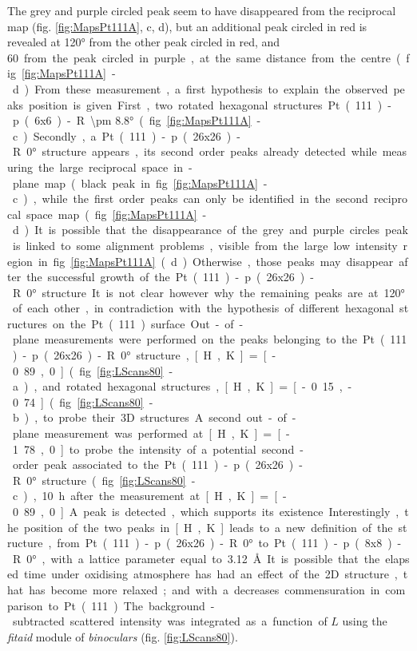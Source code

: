 The grey and purple circled peak seem to have disappeared from the reciprocal map (fig. \ref{fig:MapsPt111A}, c, d), but an additional peak circled in red is revealed at \ang{120} from the other peak circled in red, and \qty{60} from the peak circled in purple, at the same distance from the centre (fig. \ref{fig:MapsPt111A} - d).
From these measurement, a first hypothesis to explain the observed peaks position is given.
First, two rotated hexagonal structures Pt(111)-p(6x6)-R\ang{\pm 8.8} (fig. \ref{fig:MapsPt111A} - c).
Secondly, a Pt(111)-p(26x26)-R\ang{0} structure appears, its second order peaks already detected while measuring the large reciprocal space in-plane map (black peak in fig. \ref{fig:MapsPt111A} - c), while the first order peaks can only be identified in the second reciprocal space map (fig. \ref{fig:MapsPt111A} - d).
It is possible that the disappearance of the grey and purple circles peak is linked to some alignment problems, visible from the large low intensity region in fig. \ref{fig:MapsPt111A} (d).
Otherwise, those peaks may disappear after the successful growth of the Pt(111)-p(26x26)-R\ang{0} structure.
It is not clear however why the remaining peaks are at \ang{120} of each other, in contradiction with the hypothesis of different hexagonal structures on the Pt(111) surface.

Out-of-plane measurements were performed on the peaks belonging to the Pt(111)-p(26x26)-R\ang{0} structure, [H, K] = [-0.89, 0] (fig. \ref{fig:LScans80} - a), and rotated hexagonal structures, [H, K] = [-0.15, -0.74] (fig. \ref{fig:LScans80} - b), to probe their 3D structures.
A second out-of-plane measurement was performed at [H, K] = [-1.78, 0] to probe the intensity of a potential second-order peak associated to the Pt(111)-p(26x26)-R\ang{0} structure (fig. \ref{fig:LScans80} - c), \qty{10}{\hour} after the measurement at [H, K] = [-0.89, 0].
A peak is detected, which supports its existence.

Interestingly, the position of the two peaks in [H, K] leads to a new definition of the structure, from Pt(111)-p(26x26)-R\ang{0} to Pt(111)-p(8x8)-R\ang{0}, with a lattice parameter equal to \qty{3.12}{\angstrom}.
It is possible that the elapsed time under oxidising atmosphere has had an effect of the 2D structure, that has become more relaxed; and with a decreases commensuration in comparison to Pt(111).
The background-subtracted scattered intensity was integrated as a function of $L$ using the \textit{fitaid} module of \textit{binoculars} (fig. \ref{fig:LScans80}).

